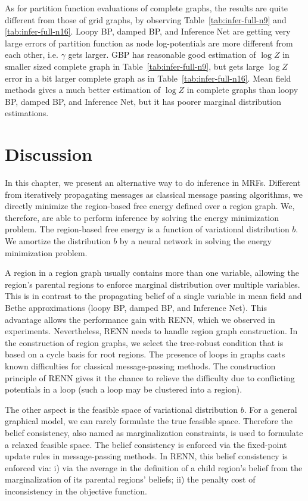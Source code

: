As for partition function evaluations of complete graphs, the results are quite different from those of grid graphs, by observing Table~\ref{tab:infer-full-n9} and \ref{tab:infer-full-n16}. Loopy BP, damped BP, and Inference Net are getting very large errors of partition function as node log-potentials are more different from each other, i.e. $\gamma$ gets larger. GBP has reasonable good estimation of $\log{Z}$ in smaller sized complete graph in Table~\ref{tab:infer-full-n9}, but gets large $\log{Z}$ error in a bit larger complete graph as in Table~\ref{tab:infer-full-n16}. Mean field methods gives a much better estimation of $\log{Z}$ in complete graphs than loopy BP, damped BP, and Inference Net, but it has poorer marginal distribution estimations.

\section{Discussion}
In this chapter, we present an alternative way to do inference in MRFs. Different from iteratively propagating messages as classical message passing algorithms, we directly minimize the region-based free energy defined over a region graph. We, therefore, are able to perform inference by solving the energy minimization problem.
The region-based free energy is a function of variational distribution $b$. We amortize the distribution $b$ by a neural network in solving the energy minimization problem.

A region in a region graph usually contains more than one variable, allowing the region's parental regions to enforce marginal distribution over multiple variables. This is in contrast to the propagating belief of a single variable in mean field and Bethe approximations (loopy BP, damped BP, and Inference Net). This advantage allows the performance gain with RENN, which we observed in experiments. Nevertheless, RENN needs to handle region graph construction. In the construction of region graphs, we select the tree-robust condition that is based on a cycle basis for root regions. The presence of loops in graphs casts known difficulties for classical message-passing methods. The construction principle of RENN gives it the chance to relieve the difficulty due to conflicting potentials in a loop (such a loop may be clustered into a region).

The other aspect is the feasible space of variational distribution $b$. For a general graphical model, we can rarely formulate the true feasible space. Therefore the belief consistency, also named as marginalization constraints, is used to formulate a relaxed feasible space. The belief consistency is enforced via the fixed-point update rules in message-passing methods. In RENN, this belief consistency is enforced via: i) via the average in the definition of a child region's belief from the marginalization of its parental regions' beliefs; ii) the penalty cost of inconsistency in the objective function. 

